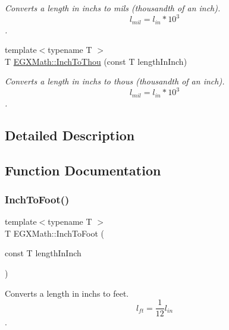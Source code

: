 \begin{DoxyCompactItemize}
\begin{DoxyCompactList}\small\item\em Converts a length in inchs to mils (thousandth of an inch). \[ l_{mil}=l_{in} * 10^{3} \]. \end{DoxyCompactList}\item 
{\footnotesize template$<$typename T $>$ }\\T \mbox{\hyperlink{group___e_g_x_math-_conversions-_length_conversions-_imperial-_inch-_imperial_ga2f69d70d71ea01a37e6b8c97c0a95204}{E\+G\+X\+Math\+::\+Inch\+To\+Thou}} (const T length\+In\+Inch)
\begin{DoxyCompactList}\small\item\em Converts a length in inchs to thous (thousandth of an inch). \[ l_{mil}= l_{in} * 10^{3} \]. \end{DoxyCompactList}\end{DoxyCompactItemize}


\subsection{Detailed Description}


\subsection{Function Documentation}
\mbox{\label{group___e_g_x_math-_conversions-_length_conversions-_imperial-_inch-_imperial_gafb7c73e11f7d4c0c71dd62ee4a02267d}} 
\subsubsection{\texorpdfstring{Inch\+To\+Foot()}{InchToFoot()}}
{\footnotesize\ttfamily template$<$typename T $>$ \\
T E\+G\+X\+Math\+::\+Inch\+To\+Foot (\begin{DoxyParamCaption}\item[{const T}]{length\+In\+Inch }\end{DoxyParamCaption})}



Converts a length in inchs to feet. \[ l_{ft}= \frac{1}{12} l_{in} \]. 

